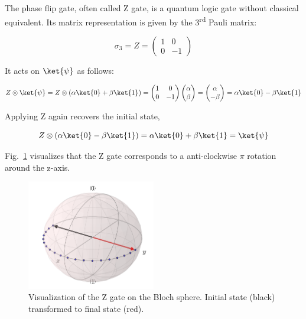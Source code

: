 The phase flip gate, often called Z gate, is a quantum logic gate without classical equivalent. Its matrix representation is given by the 3\textsuperscript{rd} Pauli matrix:

\begin{equation}
\sigma_{3} = Z = \begin{pmatrix}
 1 & 0 \\ 
 0 & -1
 \end{pmatrix}
\end{equation}

It acts on $\ket{\psi}$ as follows:

\begin{equation}
\label{equ:zverification1}
Z \otimes \ket{\psi} = Z \otimes (\alpha \ket{0} + \beta \ket{1}) = \begin{pmatrix}
 1 & 0 \\ 
 0 & -1
 \end{pmatrix} \begin{pmatrix}
 \alpha  \\ 
 \beta
 \end{pmatrix} = \begin{pmatrix}
 \alpha  \\ 
 -\beta
 \end{pmatrix} = \alpha \ket{0} - \beta \ket{1}
\end{equation}

Applying Z again recovers the initial state,

\begin{equation}
\label{equ:zverification2}
Z \otimes (\alpha \ket{0} - \beta \ket{1}) = \alpha \ket{0} + \beta \ket{1} = \ket{\psi}
\end{equation}

Fig.~\ref{img:blochzgate} visualizes that the Z gate corresponds to a anti-clockwise $\pi$ rotation around the z-axis.

\begin{figure}[ht]
   \centering
   \includegraphics[width=0.5\textwidth]{img/blochzgate.png}
   \caption{Visualization of the Z gate on the Bloch sphere. Initial state (black) transformed to final state (red).}
   \label{img:blochzgate}
\end{figure}


